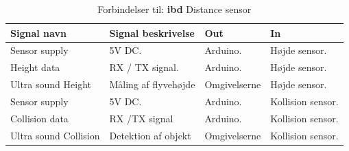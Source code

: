 \begin{table}[H]
	\centering
		\begin{tabular}{|p{2.6 cm}|p{4.9 cm}|p{2.3 cm}|p{2.7 cm}|} 
		\hline
			\textbf{Signal navn} 	& \textbf{Signal beskrivelse}		& \textbf{Out} 				& \textbf{In}     \\ \hline
			Sensor supply 		& 5V DC.  				& Arduino. 			& Højde sensor.  \\ \hline
			Height data 		& RX / TX signal. 		& Arduino.			& Højde sensor.	\\ \hline
			Ultra sound \newline Height 	& Måling af flyvehøjde 	& Omgivelserne		& Højde sensor.	\\ \hline
			
			Sensor supply & 5V DC. & Arduino. & Kollision sensor.	\\ \hline
			Collision data & RX /TX signal & Arduino. & Kollision sensor.			    \\ \hline
			Ultra sound \newline Collision 	& Detektion af objekt	& Omgivelserne		& Kollision sensor.	\\ \hline
			
		\end{tabular}
	\caption{Forbindelser til: \textbf{ibd} Distance sensor}
	\label{tab:IBDDistancesensor}
\end{table}
